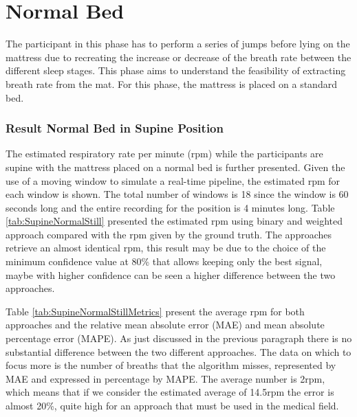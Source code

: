 \section{Normal Bed}

The participant in this phase has to perform a series of jumps before lying on the mattress due to recreating the increase or decrease of the breath rate between the different sleep stages. This phase aims to understand the feasibility of extracting breath rate from the mat. For this phase, the mattress is placed on a standard bed.



\subsubsection{Result Normal Bed in Supine Position}   \label{cap:ResultNormalBed1}

The estimated respiratory rate per minute (rpm) while the participants are supine with the mattress placed on a normal bed is further presented. Given the use of a moving window to simulate a real-time pipeline, the estimated rpm for each window is shown. 
The total number of windows is 18 since the window is 60 seconds long and the entire recording for the position is 4 minutes long. Table \ref{tab:SupineNormalStill} presented the estimated rpm using binary and weighted approach compared with the rpm given by the ground truth. The approaches retrieve an almost identical rpm, this result may be due to the choice of the minimum confidence value at 80\% that allows keeping only the best signal, maybe with higher confidence can be seen a higher difference between the two approaches. 

\vspace{0.5cm}


Table \ref{tab:SupineNormalStillMetrics} present the average rpm for both approaches  
and the relative mean absolute error (MAE) and mean absolute percentage error (MAPE). As just discussed in the previous paragraph there is no substantial difference between the two different approaches. The data on which to focus more is the number of breaths that the algorithm misses, represented by MAE and expressed in percentage by MAPE. The average number is 2rpm, which means that if we consider the estimated average of 14.5rpm the error is almost 20\%, quite high for an approach that must be used in the medical field.

